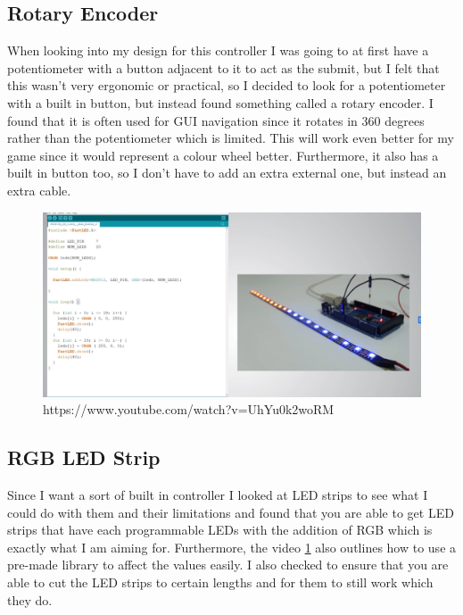 \documentclass{article}
\begin{document}
\subsection{Rotary Encoder}

When looking into my design for this controller I was going to at first have a potentiometer with a button adjacent to it to act as the submit, but I felt that this wasn't very ergonomic or practical, so I decided to look for a potentiometer with a built in button, but instead found something called a rotary encoder. I found that it is often used for GUI navigation since it rotates in 360 degrees rather than the potentiometer which is limited. This will work even better for my game since it would represent a colour wheel better. Furthermore, it also has a built in button too, so I don't have to add an extra external one, but instead an extra cable.

\begin{figure}[ht]
  \includegraphics[width=\textwidth,height=\textheight,keepaspectratio]{led_strip.PNG}
  \caption{https://www.youtube.com/watch?v=UhYu0k2woRM}
  \label{fig:rgb_led_strip}
\end{figure}

\subsection{RGB LED Strip}

Since I want a sort of built in controller I looked at LED strips to see what I could do with them and their limitations and found that you are able to get LED strips that have each programmable LEDs with the addition of RGB which is exactly what I am aiming for. Furthermore, the video \ref{fig:rgb_led_strip} also outlines how to use a pre-made library to affect the values easily. I also checked to ensure that you are able to cut the LED strips to certain lengths and for them to still work which they do.
\end{document}
